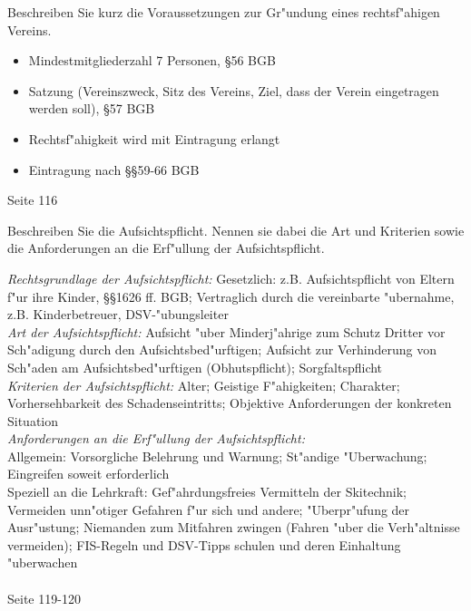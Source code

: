 \begin{question}{2}
Beschreiben Sie kurz die Voraussetzungen zur Gr"undung eines rechtsf"ahigen Vereins.
\end{question}
\begin{solution}
\begin{itemize}
\item Mindestmitgliederzahl 7 Personen, \S 56 BGB
\item Satzung (Vereinszweck, Sitz des Vereins, Ziel, dass der Verein eingetragen werden soll), \S 57 BGB
\item Rechtsf"ahigkeit wird mit Eintragung erlangt
\item Eintragung nach \S\S 59-66 BGB
\end{itemize}
 Seite 116
\end{solution}

\begin{question}{7}
Beschreiben Sie die Aufsichtspflicht. Nennen sie dabei die Art und Kriterien sowie die Anforderungen an die Erf"ullung der Aufsichtspflicht.
\end{question}
\begin{solution}
\emph{Rechtsgrundlage der Aufsichtspflicht:} Gesetzlich: z.B. Aufsichtspflicht von Eltern f"ur ihre Kinder, \S\S 1626 ff. BGB; Vertraglich durch die vereinbarte "ubernahme, z.B. Kinderbetreuer, DSV-"ubungsleiter\\
\emph{Art der Aufsichtspflicht:} Aufsicht "uber Minderj"ahrige zum Schutz Dritter vor Sch"adigung durch den Aufsichtsbed"urftigen; Aufsicht zur Verhinderung von Sch"aden am Aufsichtsbed"urftigen (Obhutspflicht); Sorgfaltspflicht\\
\emph{Kriterien der Aufsichtspflicht:} Alter; Geistige F"ahigkeiten; Charakter; Vorhersehbarkeit des Schadenseintritts; Objektive Anforderungen der konkreten Situation\\
\emph{Anforderungen an die Erf"ullung der Aufsichtspflicht:}\\
Allgemein: Vorsorgliche Belehrung und Warnung; St"andige "Uberwachung; Eingreifen soweit erforderlich\\
Speziell an die Lehrkraft: Gef"ahrdungsfreies Vermitteln der Skitechnik; Vermeiden unn"otiger Gefahren f"ur sich und andere; "Uberpr"ufung der Ausr"ustung; Niemanden zum Mitfahren zwingen (Fahren "uber die Verh"altnisse vermeiden); FIS-Regeln und DSV-Tipps schulen und deren Einhaltung "uberwachen\\\\
 Seite 119-120
\end{solution}

